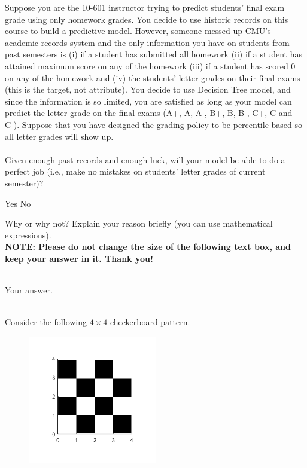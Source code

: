 \documentclass[11pt,addpoints,answers]{exam}
\numberwithin{equation}{section} %
\numberwithin{figure}{section} %
\numberwithin{table}{section} %
\begin{document}
\begin{questions}

    \question[3] Suppose you are the 10-601 instructor trying to predict students' final exam grade using only homework grades. You decide to use historic records on this course to build a predictive model. However, someone messed up CMU's academic records system and the only information you have on students from past semesters is (i) if a student has submitted all homework (ii) if a student has attained maximum score on any of the homework (iii) if a student has scored 0 on any of the homework and  (iv) the students' letter grades on their final exams (this is the target, not attribute). You decide to use Decision Tree model, and since the information is so limited, you are satisfied as long as your model can predict the letter grade on the final exams  (A+, A, A-, B+, B, B-, C+, C and C-). Suppose that you have designed the grading policy to be percentile-based so all letter grades will show up. \\ \\
    Given enough past records and enough luck, will your model be able to do a perfect job (i.e., make no mistakes on students' letter grades of current semester)?
    
    \begin{checkboxes}
        \choice Yes
        \choice No
    \end{checkboxes}
    Why or why not? Explain your reason briefly (you can use mathematical expressions).\\
    
    \textbf{NOTE: Please do not change the size of the following text box, and keep your answer in it. Thank you!} \\ \\
    \begin{tcolorbox}[fit,height=2cm, width=15cm, blank, borderline={1pt}{-2pt},nobeforeafter,top=2pt, left=2pt, right=2pt, bottom=2pt]
    \large
    Your answer.

    \end{tcolorbox} \\
    
    \newpage
    \question[2] Consider the following $4\times 4$ checkerboard pattern. 
    \begin{figure}[H]
        \centering
        \includegraphics[width = 0.5\textwidth]{checkerboard.png}
        \label{Q_2dt}
    \end{figure}
    \begin{parts}

\end{parts}
\end{questions}
\end{document}
